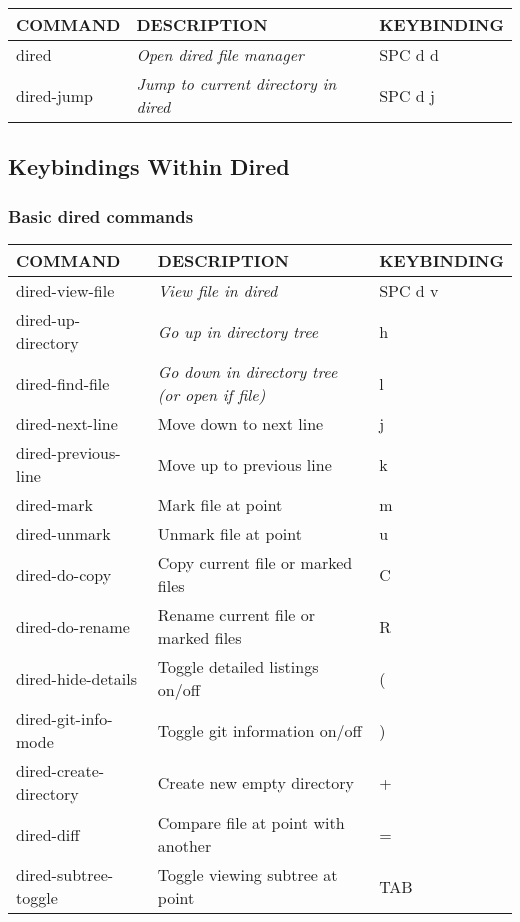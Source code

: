 \documentclass[11pt]{article}
\begin{document}
\begin{center}
\begin{tabular}{lll}
COMMAND & DESCRIPTION & KEYBINDING\\[0pt]
\hline
dired & \emph{Open dired file manager} & SPC d d\\[0pt]
dired-jump & \emph{Jump to current directory in dired} & SPC d j\\[0pt]
\end{tabular}
\end{center}

\subsection{Keybindings Within Dired}
\label{sec:org268f69f}
\subsubsection{Basic dired commands}
\label{sec:org83cb28f}

\begin{center}
\begin{tabular}{lll}
COMMAND & DESCRIPTION & KEYBINDING\\[0pt]
\hline
dired-view-file & \emph{View file in dired} & SPC d v\\[0pt]
dired-up-directory & \emph{Go up in directory tree} & h\\[0pt]
dired-find-file & \emph{Go down in directory tree (or open if file)} & l\\[0pt]
dired-next-line & Move down to next line & j\\[0pt]
dired-previous-line & Move up to previous line & k\\[0pt]
dired-mark & Mark file at point & m\\[0pt]
dired-unmark & Unmark file at point & u\\[0pt]
dired-do-copy & Copy current file or marked files & C\\[0pt]
dired-do-rename & Rename current file or marked files & R\\[0pt]
dired-hide-details & Toggle detailed listings on/off & (\\[0pt]
dired-git-info-mode & Toggle git information on/off & )\\[0pt]
dired-create-directory & Create new empty directory & +\\[0pt]
dired-diff & Compare file at point with another & =\\[0pt]
dired-subtree-toggle & Toggle viewing subtree at point & TAB\\[0pt]
\end{tabular}
\end{center}
\end{document}
